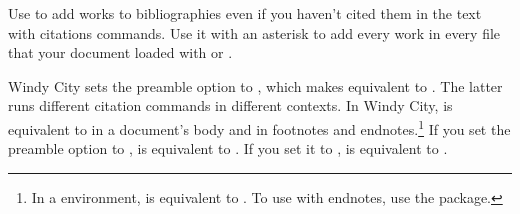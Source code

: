 \documentclass[11pt,letterpaper,oneside]{article}
\begin{document}
Use  to add works to bibliographies even if you haven't
cited them in the text with citations commands. Use it with an
asterisk to add every work in every  file that your document
loaded with  or .

Windy City sets the  preamble option to ,
which makes  equivalent to . The latter
runs different citation commands in different contexts. In Windy City,
 is equivalent to  in a document's body
and  in footnotes and endnotes.\footnote{In a 
environment,  is equivalent to . To use
 with endnotes, use the  package.} If you
set the  preamble option to , 
is equivalent to . If you set it to ,
 is equivalent to .
\end{document}
